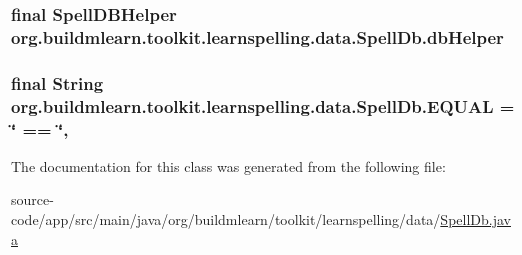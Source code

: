 \subsubsection[{\texorpdfstring{db\+Helper}{dbHelper}}]{\setlength{\rightskip}{0pt plus 5cm}final Spell\+D\+B\+Helper org.\+buildmlearn.\+toolkit.\+learnspelling.\+data.\+Spell\+Db.\+db\+Helper\hspace{0.3cm}{\ttfamily [private]}}\hypertarget{classorg_1_1buildmlearn_1_1toolkit_1_1learnspelling_1_1data_1_1SpellDb_a5b0650c89704d8d4398b4a2d0c532738}{}\label{classorg_1_1buildmlearn_1_1toolkit_1_1learnspelling_1_1data_1_1SpellDb_a5b0650c89704d8d4398b4a2d0c532738}
\subsubsection[{\texorpdfstring{E\+Q\+U\+AL}{EQUAL}}]{\setlength{\rightskip}{0pt plus 5cm}final String org.\+buildmlearn.\+toolkit.\+learnspelling.\+data.\+Spell\+Db.\+E\+Q\+U\+AL = \char`\"{} == \char`\"{}\hspace{0.3cm}{\ttfamily [static]}, {\ttfamily [private]}}\hypertarget{classorg_1_1buildmlearn_1_1toolkit_1_1learnspelling_1_1data_1_1SpellDb_a4fe1695ad33239e5c78d2a864249ec58}{}\label{classorg_1_1buildmlearn_1_1toolkit_1_1learnspelling_1_1data_1_1SpellDb_a4fe1695ad33239e5c78d2a864249ec58}


The documentation for this class was generated from the following file\+:\begin{DoxyCompactItemize}
\item 
source-\/code/app/src/main/java/org/buildmlearn/toolkit/learnspelling/data/\hyperlink{SpellDb_8java}{Spell\+Db.\+java}\end{DoxyCompactItemize}
